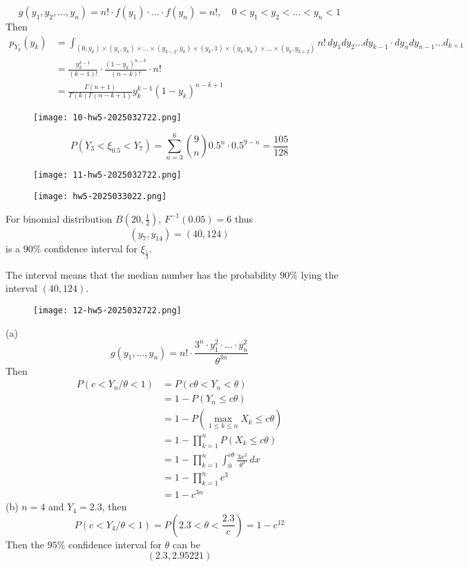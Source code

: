 \[
g(y_1,y_2,\dots,y_n)=n!\cdot f(y_1)\cdot\dots \cdot f(y_n)=n!,\quad 0<y_1<y_2<\dots<y_n<1
\]
Then
\[
\begin{aligned}
p_{Y_k}(y_k) & =\int_{(0,y_k)\times (y_1,y_k)\times \dots \times(y_{k-2},y_k)\times(y_k,1)\times(y_{k},y_n)\times\dots \times(y_k,y_{k+2})}^{} n! \, dy_1dy_2\dots dy_{k-1}\cdot dy_ndy_{n-1}\dots d_{k+1} \\
 & =\frac{y_k^{k-1}}{(k-1)!}\cdot\frac{(1-y_k)^{n-k}}{(n-k)!}\cdot n! \\
 & =\frac{\Gamma(n+1)}{\Gamma(k)\Gamma(n-k+1)}y_k^{k-1}(1-y_k)^{n-k+1} 
\end{aligned}
\]
\begin{exercise}
\begin{figure}[H]
\centering
\texttt{[image: 10-hw5-2025032722.png]}
\label{}
\end{figure}
\end{exercise}
\[
P(Y_3<\xi_{0.5}<Y_7)=\sum_{n=3}^{6} {\binom{9}{n} }0.5^{n}\cdot 0.5^{9-n}=\frac{105}{128}
\]
\begin{exercise}
\begin{figure}[H]
\centering
\texttt{[image: 11-hw5-2025032722.png]}
\label{}
\end{figure}
\end{exercise}
\begin{figure}[H]
\centering
\texttt{[image: hw5-2025033022.png]}
\label{}
\end{figure}

For binomial distribution $B\left( 20,\frac{1}{2} \right)$, $F^{-1}(0.05)=6$ thus
\[
(y_7,y_{14})=(40,124)
\]
is a $90\%$ confidence interval for $\xi_{\frac{1}{2}}$.

The interval means that the median number has the probability $90\%$ lying the interval $(40,124)$.

\begin{exercise}
\begin{figure}[H]
\centering
\texttt{[image: 12-hw5-2025032722.png]}
\label{}
\end{figure}
\end{exercise}
(a)
\[
g(y_1,\dots,y_n)=n!\cdot\frac{3^{n}\cdot y_1^2\cdot \dots \cdot y_n^2}{\theta^{3n}}
\]
Then
\[
\begin{aligned}
P(c<Y_n/\theta<1) & =P(c\theta <Y_n<\theta) \\
 & =1-P(Y_n\leq c\theta) \\
 & =1-P(\max_{1\leq k\leq n}X_k\leq c\theta) \\
 & =1-\prod_{k=1}^{n} P(X_k\leq c\theta) \\
 & =1-\prod_{k=1}^{n} \int_{0}^{c\theta} \frac{3x^2}{\theta^{3}} \, dx \\
  & =1-\prod_{k=1}^{n} c^{3} \\
 & =1-c^{3n}
\end{aligned}
\]
(b)
$n=4$ and $Y_4=2.3$, then
\[
P(c<Y_4/\theta<1)=P\left( 2.3<\theta<\frac{2.3}{c} \right)=1-c^{12}
\]
Then the $95\%$ confidence interval for $\theta$ can be
\[
(2.3,2.95221)
\]